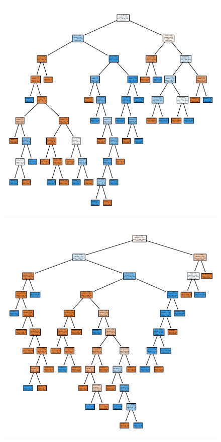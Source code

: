 \documentclass{template}
\begin{document}
\begin{figure}
\includegraphics[scale=0.7]{RF3.png}
\caption{}
\label{fig:logo}
\end{figure}
\begin{figure}
\includegraphics[scale=0.7]{RF4.png}
\caption{}
\label{fig:logo}
\end{figure}
\end{document}
